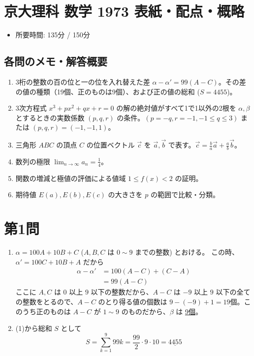 \documentclass[../main.tex]{subfiles}
\begin{document}
\section*{京大理科 数学 1973 表紙・配点・概略}

\begin{itemize}
  \item 所要時間: 135分 / 150分
\end{itemize}

\subsection*{各問のメモ・解答概要}
\begin{enumerate}
  \item 3桁の整数の百の位と一の位を入れ替えた差 $\alpha - \alpha' = 99(A-C)$。その差の値の種類（19個、正のものは9個）、および正の値の総和 ($S = 4455$)。
  \item 3次方程式 $x^3 + px^2 + qx + r = 0$ の解の絶対値がすべて1で1以外の2根を $\alpha, \beta$ とするときの実数係数 $(p, q, r)$ の条件。$(p = -q, r = -1, -1 \le q \le 3)$ または $(p, q, r) = (-1, -1, 1)$。
  \item 三角形 $ABC$ の頂点 $C$ の位置ベクトル $\vec{c}$ を $\vec{a}, \vec{b}$ で表す。$\vec{c} = \frac{b}{a}\vec{a} + \frac{a}{b}\vec{b}$。
  \item 数列の極限 $\lim_{n\to\infty} a_n = \frac{1}{4}$。
  \item 関数の増減と極値の評価による値域 $1 \le f(x) < 2$ の証明。
  \item 期待値 $E(a), E(b), E(c)$ の大きさを $p$ の範囲で比較・分類。
\end{enumerate}

\newpage

\section*{第1問}

\noindent
[\textbf{解}]
\begin{enumerate}
  \item[(1)] $\alpha = 100A + 10B + C$ ($A, B, C$ は $0 \sim 9$ までの整数) とおける。
    この時、$\alpha' = 100C + 10B + A$ だから
    \begin{align*}
      \alpha - \alpha' &= 100(A - C) + (C - A) \\
      &= 99(A - C)
    \end{align*}
    ここに $A, C$ は $0$ 以上 $9$ 以下の整数だから、$A - C$ は $-9$ 以上 $9$ 以下の全ての整数をとるので、$A - C$ のとり得る値の個数は $9 - (-9) + 1 = \underline{19\text{個}}$。このうち正のものは $A - C$ が $1 \sim 9$ のものだから、$\beta$ は \underline{9個}。

  \item[(2)] (1)から総和 $S$ として
    \[
      S = \sum_{k=1}^9 99k = \frac{99}{2} \cdot 9 \cdot 10 = \underline{4455}
    \]
\end{enumerate}
\end{document}
